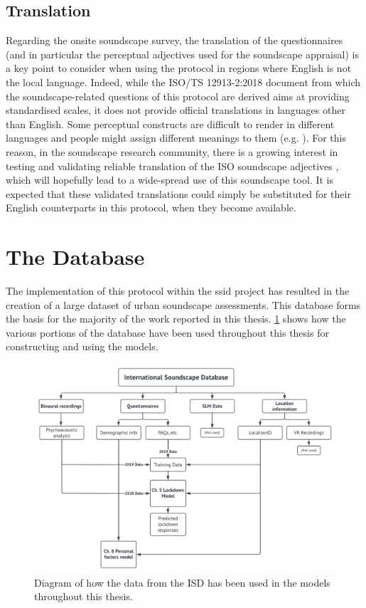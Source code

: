  \subsection{Translation}

   Regarding the onsite soundscape survey, the translation of the questionnaires (and in particular the perceptual adjectives used for the soundscape appraisal) is a key point to consider when using the protocol in regions where English is not the local language. Indeed, while the ISO/TS 12913-2:2018 document from which the soundscape-related questions of this protocol are derived aims at providing standardised scales, it does not provide official translations in languages other than English. Some perceptual constructs are difficult to render in different languages and people might assign different meanings to them (e.g. \citep{Tarlao2016Comparing,Jeon2018cross,Nagahata2019Examination,AlmagroPastor2019Soundscape}). For this reason, in the soundscape research community, there is a growing interest in testing and validating reliable translation of the ISO soundscape adjectives \citep{Aletta2020Soundscape}, which will hopefully lead to a wide-spread use of this soundscape tool. It is expected that these validated translations could simply be substituted for their English counterparts in this protocol, when they become available.
   

\section{The Database} 

The implementation of this protocol within the \gls{ssid} project has resulted in the creation of a large dataset of urban soundscape assessments. This database forms the basis for the majority of the work reported in this thesis. \cref{fig:databaseUse} shows how the various portions of the database have been used throughout this thesis for constructing and using the models.

\begin{figure}[h]
  \centering
  \includegraphics[width=\textwidth]{Figures/Database use figure.png}
  \caption{Diagram of how the data from the ISD has been used in the models throughout this thesis. \label{fig:databaseUse}}
\end{figure}


